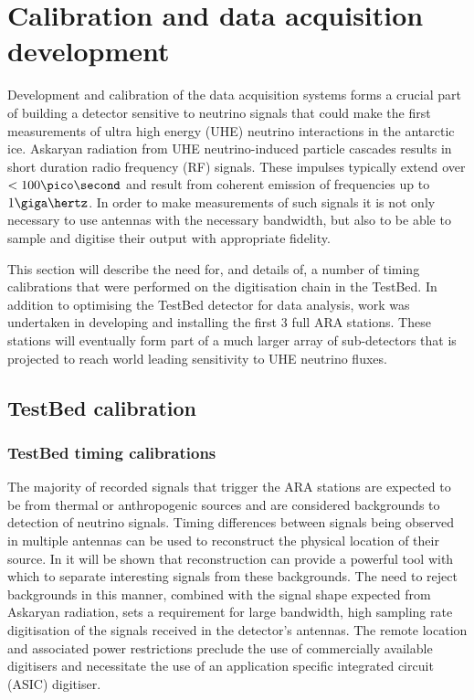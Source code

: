 \chapter{Calibration and data acquisition development}
\label{chap:Calibration}

 Development and calibration of the data acquisition systems forms a crucial part of building a detector sensitive to neutrino signals that could make the first measurements of ultra high energy (UHE) neutrino interactions in the antarctic ice. Askaryan radiation from UHE neutrino-induced particle cascades results in short duration radio frequency (RF) signals. These impulses typically extend over $< 100 \pico \second$ and result from coherent emission of frequencies up to $1 \giga \hertz$. In order to make measurements of such signals it is not only necessary to use antennas with the necessary bandwidth, but also to be able to sample and digitise their output with appropriate fidelity.


This section will describe the need for, and details of, a number of timing calibrations that were performed on the digitisation chain in the TestBed. In addition to optimising the TestBed detector for data analysis, work was undertaken in developing and installing the first 3 full ARA stations. These stations will eventually form part of a much larger array of sub-detectors that is projected to reach world leading sensitivity to UHE neutrino fluxes.

\section{TestBed calibration}
\label{sec:calibration:TestBed-calibration}



\subsection{TestBed timing calibrations}
\label{sec:calibration:LABRADOR-Digitiser-Chip}

The majority of recorded signals that trigger the ARA stations are expected to be from thermal or anthropogenic sources and are considered backgrounds to detection of neutrino signals. Timing differences between signals being observed in multiple antennas can be used to reconstruct the physical location of their source. In  it will be shown that reconstruction can provide a powerful tool with which to separate interesting signals from these backgrounds. The need to reject backgrounds in this manner, combined with the signal shape expected from Askaryan radiation, sets a requirement for large bandwidth, high sampling rate digitisation of the signals received in the detector's antennas. The remote location and associated power restrictions preclude the use of commercially available digitisers and necessitate the use of an application specific integrated circuit (ASIC) digitiser.

